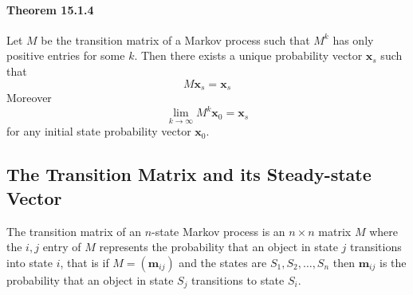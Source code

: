 \documentclass[11pt]{article}
\newcommand{\tb}[1]{\textbf{#1}}
\newcommand{\vx}[0]{\tb{x}}
\newcommand{\vm}[0]{\tb{m}}
\begin{document}
\paragraph{Theorem 15.1.4}
Let $M$ be the transition matrix of a Markov process such that $M^k$ has only positive entries for some $k$. Then there exists a unique probability vector $\vx_s$ such that $$M\vx_s = \vx_s$$
Moreover
$$\underset{k \rightarrow \infty}{\lim} M^k\vx_0 = \vx_s$$
for any initial state probability vector $\vx_0$.

\subsection{The Transition Matrix and its Steady-state Vector}
The transition matrix of an $n$-state Markov process is an $n\times n$ matrix $M$ where the $i,j$ entry of $M$ represents the probability that an object in state $j$ transitions into state $i$, that is if $M = (\vm_{ij})$ and the states are $S_1, S_2, \hdots, S_n$ then $\vm_{ij}$ is the probability that an object in state $S_j$ transitions to state $S_i$.
\end{document}
